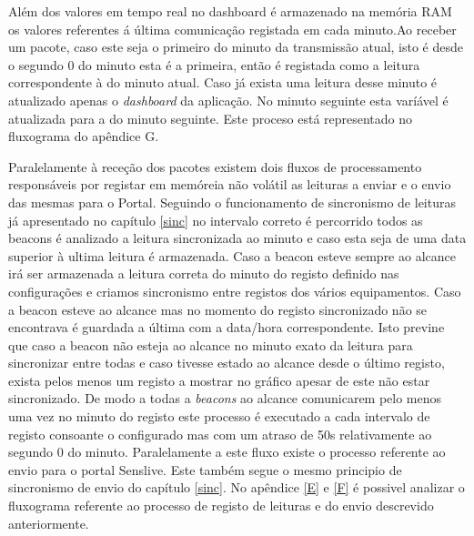\par Além dos valores em tempo real no dashboard é armazenado na memória RAM os valores referentes á última comunicação registada em cada minuto.Ao receber um pacote, caso este seja o primeiro do minuto da transmissão atual, isto é desde o segundo 0 do minuto esta é a primeira, então é registada como a leitura correspondente à do minuto atual. Caso já exista uma leitura desse minuto é atualizado apenas o \textit{dashboard} da aplicação. No minuto seguinte esta varíável é atualizada para a do minuto seguinte. Este proceso está representado no fluxograma do apêndice {G}.

\par Paralelamente à receção dos pacotes existem dois fluxos de processamento responsáveis por registar em memóreia não volátil as leituras a enviar e o envio das mesmas para o Portal. Seguindo o funcionamento de sincronismo de leituras já apresentado no capítulo \ref{sinc} no intervalo correto é percorrido todos as beacons é analizado a leitura sincronizada ao minuto e caso esta seja de uma data superior à ultima leitura é armazenada. Caso a beacon esteve sempre ao alcance irá ser armazenada a leitura correta do minuto do registo definido nas configurações e criamos sincronismo entre registos dos vários equipamentos. Caso a beacon esteve ao alcance mas no momento do registo sincronizado não se encontrava é guardada a última com a data/hora correspondente. Isto previne que caso a beacon não esteja ao alcance no minuto exato da leitura para sincronizar entre todas e caso tivesse estado ao alcance desde o último registo, exista pelos menos um registo a mostrar no gráfico apesar de este não estar sincronizado. De modo a todas a \textit{beacons} ao alcance comunicarem pelo menos uma vez no minuto do registo este processo é executado a cada intervalo de registo consoante o configurado mas com um atraso de 50s relativamente ao segundo 0 do minuto. Paralelamente a este fluxo existe o processo referente ao envio para o portal Senslive. Este também segue o mesmo principio de sincronismo de envio do capítulo \ref{sinc}. No apêndice \ref{E} e \ref{F} é possivel analizar o fluxograma referente ao processo de registo de leituras e do envio descrevido anteriormente.


